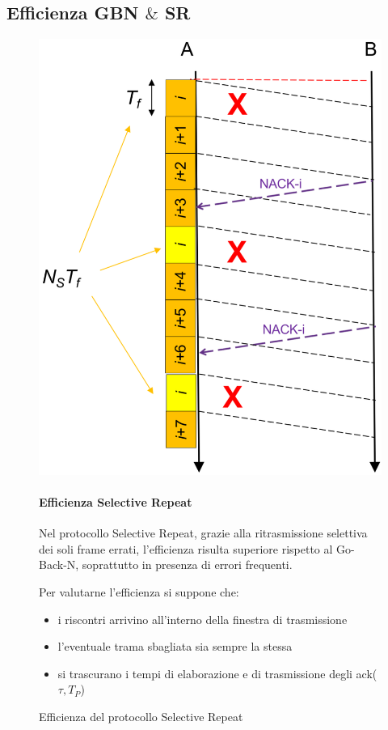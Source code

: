 \subsection{Efficienza GBN $\&$ SR}
\begin{figure}[htbp]
    \centering
    \begin{minipage}{0.4\textwidth}
        \includegraphics[width=\linewidth]{images/efficienzasr.png}
        \caption{Efficienza del protocollo Selective Repeat}
    \end{minipage}%
    \hfill
    \begin{minipage}{0.55\textwidth}
        \paragraph{Efficienza Selective Repeat}
        Nel protocollo Selective Repeat, grazie alla ritrasmissione selettiva dei soli frame errati, l'efficienza risulta superiore rispetto al Go-Back-N, soprattutto in presenza di errori frequenti. 

        Per valutarne l'efficienza si suppone che:
        \begin{itemize}
            \item i riscontri arrivino all'interno della finestra di trasmissione
            \item l'eventuale trama sbagliata sia sempre la stessa
            \item si trascurano i tempi di elaborazione e di trasmissione degli ack($\tau, T_P$)
        \end{itemize}


\end{minipage}
\end{figure}

